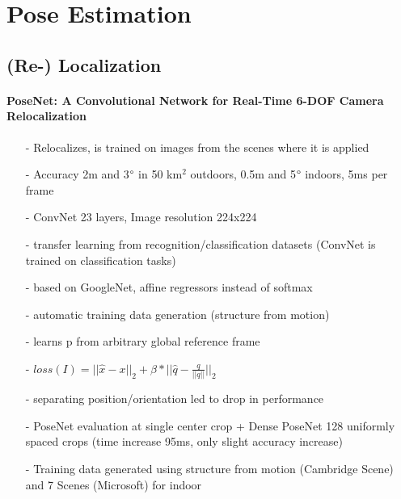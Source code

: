 \section{Pose Estimation}
\label{sec:pose_estimation}
	\subsection{(Re-) Localization}
	\paragraph{PoseNet: A Convolutional Network for Real-Time 6-DOF Camera Relocalization \cite{Kendall}}
	\begin{itemize}
		\item[-] Relocalizes, is trained on images from the scenes where it is applied	\item[-] Accuracy 2m and 3$\degree$  in 50 km$^2$ outdoors, 0.5m and 5$\degree$ indoors, 5ms per frame
		\item[-] ConvNet 23 layers, Image resolution 224x224
		\item[-] transfer learning from recognition/classification datasets (ConvNet is trained on classification tasks)
		\item[-] based on GoogleNet, affine regressors instead of softmax\item[-] automatic training data generation (structure from motion)
		\item[-] learns p from arbitrary global reference frame
		\item[-] $loss(I) = || \hat{x}-x||_2 + \beta*||\hat{q}-\frac{q}{||q||}||_2$
		\item[-] separating position/orientation led to drop in performance
		\item[-] PoseNet evaluation at single center crop + Dense PoseNet 128 uniformly spaced crops (time increase 95ms, only slight accuracy increase)
		\item[-] Training data generated using structure from motion (Cambridge Scene) and 7 Scenes (Microsoft) for indoor
		
	\end{itemize}
